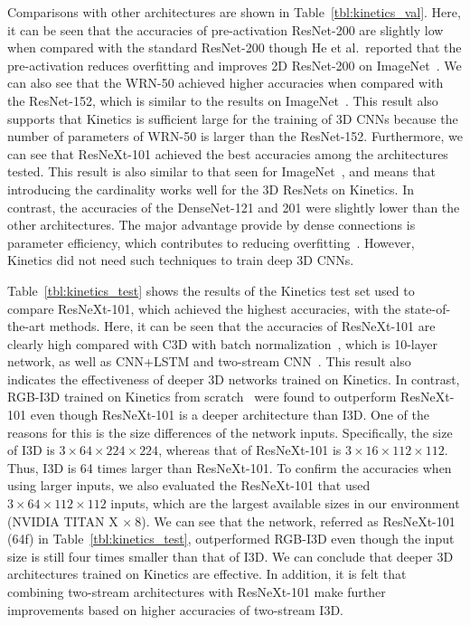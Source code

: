 \documentclass[10pt,twocolumn,letterpaper]{article}
\begin{document}
    Comparisons with other architectures are shown in Table~\ref{tbl:kinetics_val}.
    Here, it can be seen that the accuracies of pre-activation ResNet-200 are slightly low when compared with the standard ResNet-200
    though He et al.\ reported that the pre-activation reduces overfitting and improves 2D ResNet-200 on ImageNet~\cite{He2016}.
    We can also see that the WRN-50 achieved higher accuracies when compared with the ResNet-152,
    which is similar to the results on ImageNet~\cite{WideResNet}.
    This result also supports that Kinetics is sufficient large for the training of 3D CNNs
    because the number of parameters of WRN-50 is larger than the ResNet-152.
    Furthermore, we can see that ResNeXt-101 achieved the best accuracies among the architectures tested.
    This result is also similar to that seen for ImageNet~\cite{resnext},
    and means that introducing the cardinality works well for the 3D ResNets on Kinetics.
    In contrast, the accuracies of the DenseNet-121 and 201 were slightly lower than the other architectures.
    The major advantage provide by dense connections is parameter efficiency,
    which contributes to reducing overfitting~\cite{densenets}.
    However, Kinetics did not need such techniques to train deep 3D CNNs.

    Table~\ref{tbl:kinetics_test} shows the results of the Kinetics test set
    used to compare ResNeXt-101, which achieved the highest accuracies, with the state-of-the-art methods.
    Here, it can be seen that the accuracies of ResNeXt-101 are clearly high
    compared with C3D with batch normalization~\cite{Kinetics}, which is 10-layer network,
    as well as CNN+LSTM and two-stream CNN~\cite{Kinetics}.
    This result also indicates the effectiveness of deeper 3D networks trained on Kinetics.
    In contrast, RGB-I3D trained on Kinetics from scratch~\cite{I3D_arxiv} were found to outperform ResNeXt-101
    even though ResNeXt-101 is a deeper architecture than I3D.
    One of the reasons for this is the size differences of the network inputs.
    Specifically, the size of I3D is \(3 \times 64 \times 224 \times 224\),
    whereas that of ResNeXt-101 is \(3 \times 16 \times 112 \times 112\).
    Thus, I3D is 64 times larger than ResNeXt-101.
    To confirm the accuracies when using larger inputs,
    we also evaluated the ResNeXt-101 that used \(3 \times 64 \times 112 \times 112\) inputs,
    which are the largest available sizes in our environment (NVIDIA TITAN X \(\times \ 8\)).
    We can see that the network, referred as ResNeXt-101 (64f) in Table~\ref{tbl:kinetics_test},
    outperformed RGB-I3D even though the input size is still four times smaller than that of I3D.
    We can conclude that deeper 3D architectures trained on Kinetics are effective.
    In addition, it is felt that combining two-stream architectures with ResNeXt-101 make further improvements
    based on higher accuracies of two-stream I3D.
    
\end{document}
